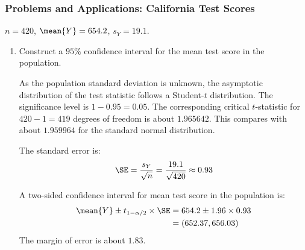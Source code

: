 \begin{frame}
\frametitle{Problems and Applications: California Test Scores}

$n=420$, $\mean{Y}=654.2$, $s_{Y}=19.1$.

\begin{enumerate}\setcounter{enumi}{0}

\item Construct a $95\%$ confidence interval for the mean test score in the population.

\begin{answer}
As the population standard deviation is unknown, the asymptotic distribution of the test statistic follows a Student-$t$ distribution. 
The significance level is $1-0.95=0.05$.
The corresponding critical $t$-statistic for $420-1=419$ degrees of freedom is about $1.965642$. This compares with about $1.959964$ for the standard normal distribution. 

The standard error is:
\begin{align*}
\SE = \frac{s_{Y}}{\sqrt{n}}
    = \frac{19.1}{\sqrt{420}}
    \approx 0.93
\end{align*}

A two-sided confidence interval for mean test score in the population is:
\begin{align*}
\mean{Y} \pm t_{1-\alpha/2} \times \SE
   & = 654.2 \pm 1.96 \times 0.93\\
   & = (652.37, 656.03)
\end{align*}
The margin of error is about $1.83$.
\end{answer}

\end{enumerate}
\end{frame}


